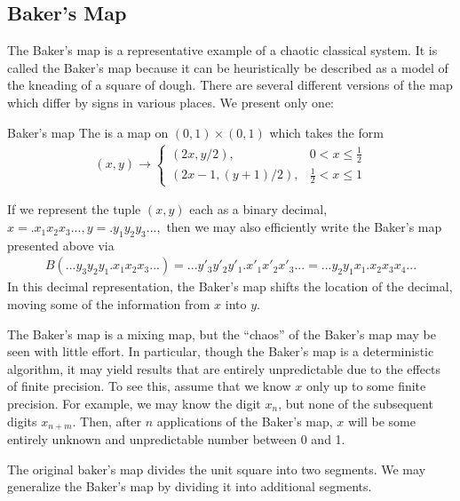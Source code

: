 \newpage
{}
\setcounter{secnumdepth}{0}
\newpage

\subsection{Baker's Map}
The Baker's map is a representative example of a chaotic classical system.
%
It is called the Baker's map because it can be heuristically be described as a model of the kneading of a square of dough.
%
There are several different versions of the map which differ by signs in various places.
%
We present only one:

\begin{definition}{Baker's map}{}
The  is a map on \((0,1)\times(0,1)\) which takes the form
\begin{align}
(x, y) \to
\begin{cases}
(2x, y/2),&0<x\leq\frac{1}{2}
\\
(2x-1, (y+1)/2),&\frac{1}{2} < x \leq 1
\end{cases}
\end{align}
\end{definition}

If we represent the tuple \((x, y)\) each as a binary decimal, \(x=.x_1 x_2 x_3..., y=.y_1y_2y_3...,\) then we may also efficiently write the Baker's map presented above via
\begin{align}
    B(...y_3 y_2 y_1 . x_1 x_2 x_3...)
    = ...y'_3 y'_2 y'_1 . x'_1 x'_2 x'_3...
    = ...y_2 y_1 x_1 . x_2 x_3 x_4...
\end{align}
In this decimal representation, the Baker's map shifts the location of the decimal, moving some of the information from \(x\) into \(y\).

The Baker's map is a mixing map, but the ``chaos'' of the Baker's map may be seen with little effort.
%
In particular, though the Baker's map is a deterministic algorithm, it may yield results that are entirely unpredictable due to the effects of finite precision.
%
To see this, assume that we know \(x\) only up to some finite precision.
%
For example, we may know the digit \(x_n\), but none of the subsequent digits \(x_{n+m}\).
%
Then, after \(n\) applications of the Baker's map, \(x\) will be some entirely unknown and unpredictable number between 0 and 1.

The original baker's map divides the unit square into two segments.
%
We may generalize the Baker's map by dividing it into additional segments.



